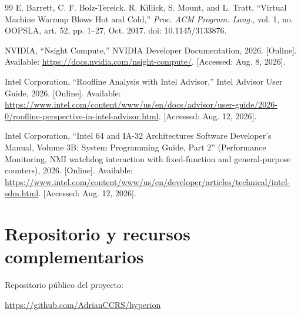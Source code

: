 \documentclass[12pt,oneside,spanish]{book}
\begin{document}
\begin{sloppypar}
\begin{thebibliography}{99}
 E. Barrett, C. F. Bolz-Tereick, R. Killick, S. Mount, and L. Tratt, ``Virtual Machine Warmup Blows Hot and Cold,'' \textit{Proc. ACM Program. Lang.}, vol. 1, no. OOPSLA, art. 52, pp. 1--27, Oct. 2017. doi: 10.1145/3133876.

 NVIDIA, ``Nsight Compute,'' NVIDIA Developer Documentation, 2026. [Online]. Available: \url{https://docs.nvidia.com/nsight-compute/}. [Accessed: Aug. 8, 2026].

 Intel Corporation, ``Roofline Analysis with Intel Advisor,'' Intel Advisor User Guide, 2026. [Online]. Available: \url{https://www.intel.com/content/www/us/en/docs/advisor/user-guide/2026-0/roofline-perspective-in-intel-advisor.html}. [Accessed: Aug. 12, 2026].

 Intel Corporation, ``Intel\textregistered{} 64 and IA-32 Architectures Software Developer's Manual, Volume 3B: System Programming Guide, Part 2'' (Performance Monitoring, NMI watchdog interaction with fixed-function and general-purpose counters), 2026. [Online]. Available: \url{https://www.intel.com/content/www/us/en/developer/articles/technical/intel-sdm.html}. [Accessed: Aug. 12, 2026].

\end{thebibliography}
\end{sloppypar}


\chapter*{Repositorio y recursos complementarios}

Repositorio público del proyecto:

\url{https://github.com/AdrianCCRS/hyperion}

\end{document}
